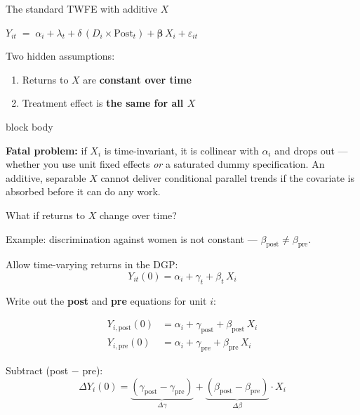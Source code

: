 \documentclass[aspectratio=169,11pt]{beamer}
\newcommand{\emphbox}[1]{%
  \begin{beamercolorbox}[rounded=true,sep=7pt,wd=\linewidth]{block body}%
    \small\color{slate}\raggedright #1%
  \end{beamercolorbox}}
\begin{document}
\begin{frame}{The standard TWFE with additive $X$}
\vspace{0.6em}
\begin{center}
\large
$Y_{it} \;=\; \alpha_i + \lambda_t
      + \delta\,(D_i \times \mathrm{Post}_t)
      + \boldsymbol{\beta}\,X_i
      + \varepsilon_{it}$
\end{center}
\vspace{0.5em}
\begin{center}
Two hidden assumptions:
\begin{enumerate}
  \item Returns to $X$ are \textbf{constant over time}
  \item Treatment effect is \textbf{the same for all $X$}
\end{enumerate}
\end{center}
\vspace{0.4em}
\emphbox{\textbf{Fatal problem:} if $X_i$ is time-invariant, it is collinear with $\alpha_i$
and drops out --- whether you use unit fixed effects \emph{or} a saturated dummy
specification. An additive, separable $X$ cannot deliver conditional parallel
trends if the covariate is absorbed before it can do any work.}
\end{frame}

\begin{frame}{What if returns to $X$ change over time?}
\vspace{0.3em}
\begin{center}\color{warmgray}\small
Example: discrimination against women is not constant --- $\beta_{\text{post}} \neq \beta_{\text{pre}}$.
\end{center}
\vspace{0.4em}

Allow time-varying returns in the DGP:
\[
Y_{it}(0) = \alpha_i + \gamma_t + \beta_t\, X_i
\]

Write out the \textbf{post} and \textbf{pre} equations for unit $i$:

\begin{align*}
Y_{i,\text{post}}(0) &= \alpha_i + \gamma_{\text{post}} + \beta_{\text{post}}\, X_i \\[4pt]
Y_{i,\text{pre}}(0)  &= \alpha_i + \gamma_{\text{pre}}  + \beta_{\text{pre}}\,  X_i
\end{align*}

Subtract (post $-$ pre):
\[
\Delta Y_i(0)
  = \underbrace{(\gamma_{\text{post}} - \gamma_{\text{pre}})}_{\Delta\gamma}
  + \underbrace{(\beta_{\text{post}}  - \beta_{\text{pre}})}_{\Delta\beta}
    \cdot X_i
\]
\end{frame}
\end{document}
